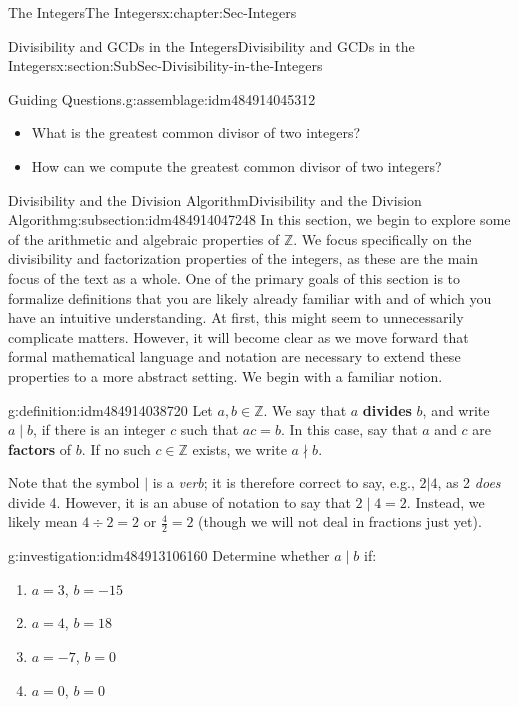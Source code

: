 \documentclass[oneside,10pt,]{book}
\newcommand{\terminology}[1]{\textbf{#1}}
\numberwithin{equation}{section}
\def\Z{{\mathbb Z}}
\begin{document}
\begin{chapterptx}{The Integers}{}{The Integers}{}{}{x:chapter:Sec-Integers}
\begin{sectionptx}{Divisibility and GCDs in the Integers}{}{Divisibility and GCDs in the Integers}{}{}{x:section:SubSec-Divisibility-in-the-Integers}
\begin{assemblage}{Guiding Questions.}{g:assemblage:idm484914045312}
\begin{itemize}[label=\textbullet]
\item{}What is the greatest common divisor of two integers?%
\item{}How can we compute the greatest common divisor of two integers?%
\end{itemize}
%
\end{assemblage}
%
%
\typeout{************************************************}
\typeout{************************************************}
%
\begin{subsectionptx}{Divisibility and the Division Algorithm}{}{Divisibility and the Division Algorithm}{}{}{g:subsection:idm484914047248}
In this section, we begin to explore some of the arithmetic and algebraic properties of \(\Z\). We focus specifically on the divisibility and factorization properties of the integers, as these are the main focus of the text as a whole. One of the primary goals of this section is to formalize definitions that you are likely already familiar with and of which you have an intuitive understanding. At first, this might seem to unnecessarily complicate matters. However, it will become clear as we move forward that formal mathematical language and notation are necessary to extend these properties to a more abstract setting. We begin with a familiar notion.%
\begin{definition}{}{g:definition:idm484914038720}%
%
%
Let \(a,b\in \Z\). We say that \(a\) \terminology{divides} \(b\), and write \(a\mid b\), if there is an integer \(c\) such that \(ac = b\). In this case, say that \(a\) and \(c\) are \terminology{factors} of \(b\). If no such \(c\in \Z\) exists, we write \(a\nmid b\).%
\end{definition}
Note that the symbol \(|\) is a \emph{verb}; it is therefore correct to say, e.g., \(2|4\), as 2 \emph{does} divide 4. However, it is an abuse of notation to say that \(2\mid 4 = 2\). Instead, we likely mean \(4\div 2 = 2\) or \(\frac{4}{2} = 2\) (though we will not deal in fractions just yet).%
\begin{investigation}{}{g:investigation:idm484913106160}%
Determine whether \(a\mid b\) if:%
\begin{enumerate}
\item{}\(a = 3\), \(b = -15\)%
\item{}\(a = 4\), \(b = 18\)%
\item{}\(a = -7\), \(b = 0\)%
\item{}\(a = 0\), \(b = 0\)%
\end{enumerate}

\end{investigation}
\end{subsectionptx}
\end{sectionptx}
\end{chapterptx}
\end{document}
